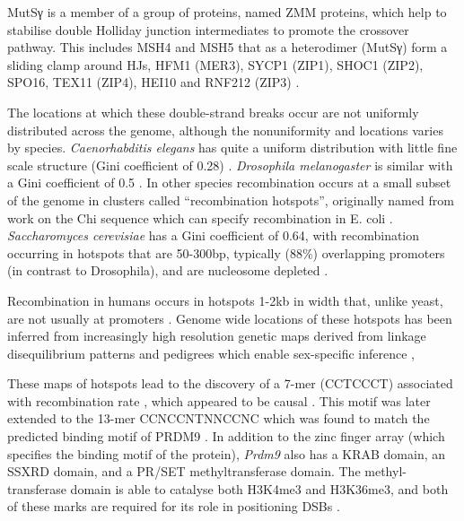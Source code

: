 MutSγ is a member of a group of proteins, named ZMM proteins, which help to stabilise double Holliday junction intermediates to promote the crossover pathway. This includes MSH4 and MSH5 that as a heterodimer (MutSγ) form a sliding clamp around HJs, HFM1 (MER3), SYCP1 (ZIP1), SHOC1 (ZIP2), SPO16, TEX11 (ZIP4), HEI10 and RNF212 (ZIP3) \parencite[reviewed in][]{Pyatnitskaya2019Crossing}.


The locations at which these double-strand breaks occur are not uniformly distributed across the genome, although the nonuniformity and locations varies by species. \textit{Caenorhabditis elegans} has quite a uniform distribution with little fine scale structure (Gini coefficient of 0.28) \parencite{Rockman2009Recombinational, Kaur2014Crossover}. \textit{Drosophila melanogaster} is similar with a Gini coefficient of 0.5 \parencite{Chan2012GenomeWide, SmukowskiHeil2015Recombining}. In other species recombination occurs at a small subset of the genome in clusters called ``recombination hotspots'', originally named from work on the Chi sequence which can specify recombination in E. coli \parencite{Lam1974RecMediated, Myers1994RecBC}. \textit{Saccharomyces cerevisiae} has a Gini coefficient of 0.64, with recombination occurring in hotspots that are 50-300bp, typically (88\%) overlapping promoters (in contrast to Drosophila), and are nucleosome depleted \parencite{Baudat1997Clustering, Wu1994Meiosisinduced, Mancera2008Highresolution, Pan2011Hierarchical, Lam2015Nonparadoxical}.

Recombination in humans occurs in hotspots 1-2kb in width that, unlike yeast, are not usually at promoters \parencite{Jeffreys2001Intensely}. Genome wide locations of these hotspots has been inferred from increasingly high resolution genetic maps derived from linkage disequilibrium patterns \parencite{McVean2004finescale, Myers2005FineScale, TheInternationalHapMapConsortium2007second, Coop2008HighResolution} and pedigrees which enable sex-specific inference \parencite{Kong2002highresolution, Kong2010Finescale, Kong2014Common, Bherer2017Refined, Halldorsson2019Characterizing},

These maps of hotspots lead to the discovery of a 7-mer (CCTCCCT) associated with recombination rate \parencite{Myers2005FineScale}, which appeared to be causal \parencite{Jeffreys2002Reciprocal}. This motif was later extended to the 13-mer CCNCCNTNNCCNC \parencite{Myers2008common} which was found to match the predicted binding motif of PRDM9 \parencite{Myers2010Drive, Baudat2010PRDM9, Parvanov2010Prdm9, Berg2010PRDM9}. In addition to the zinc finger array (which specifies the binding motif of the protein), \textit{Prdm9} also has a KRAB domain, an SSXRD domain, and a PR/SET methyltransferase domain. The methyl-transferase domain is able to catalyse both H3K4me3 and H3K36me3, and both of these marks are required for its role in positioning DSBs \parencite{Powers2016Meiotic, Diagouraga2018PRDM9}.

